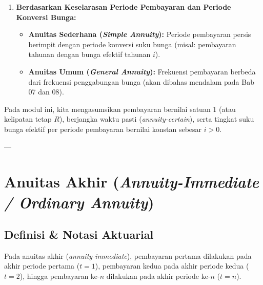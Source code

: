 \documentclass[11pt,a4paper]{article}
\begin{document}
\begin{enumerate}[label=\textbf{\arabic*.}]
    \item \textbf{Berdasarkan Keselarasan Periode Pembayaran dan Periode Konversi Bunga:}
    \begin{itemize}
        \item \textbf{Anuitas Sederhana (\textit{Simple Annuity}):} Periode pembayaran persis berimpit dengan periode konversi suku bunga (misal: pembayaran tahunan dengan bunga efektif tahunan $i$).
        \item \textbf{Anuitas Umum (\textit{General Annuity}):} Frekuensi pembayaran berbeda dari frekuensi penggabungan bunga (akan dibahas mendalam pada Bab 07 dan 08).
    \end{itemize}
\end{enumerate}

\begin{notebox}
Pada modul ini, kita mengasumsikan pembayaran bernilai satuan $1$ (atau kelipatan tetap $R$), berjangka waktu pasti (\textit{annuity-certain}), serta tingkat suku bunga efektif per periode pembayaran bernilai konstan sebesar $i > 0$.
\end{notebox}

---

\section{Anuitas Akhir (\textit{Annuity-Immediate / Ordinary Annuity})}

\subsection{Definisi \& Notasi Aktuarial}
Pada anuitas akhir (\textit{annuity-immediate}), pembayaran pertama dilakukan pada akhir periode pertama ($t = 1$), pembayaran kedua pada akhir periode kedua ($t = 2$), hingga pembayaran ke-$n$ dilakukan pada akhir periode ke-$n$ ($t = n$).

\begin{center}
\end{center}
\end{document}
